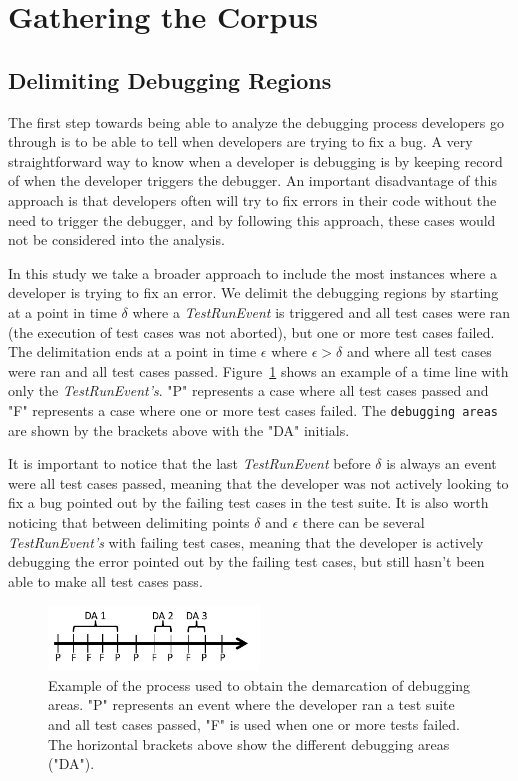 \documentclass[sigconf]{acmart}
\begin{document}
\section{Gathering the Corpus}
\subsection{Delimiting Debugging Regions}
The first step towards being able to analyze the debugging
process developers go through is to be able to tell when
developers are trying to fix a bug. A very straightforward 
way to know when a developer is debugging is by keeping
record of when the developer triggers the debugger. An important
disadvantage of this approach is that 
developers often will try to fix errors in their code without the
need to trigger the debugger, and by following this approach,
these cases would not
be considered into the analysis.

In this study we take a broader approach to include the most 
instances where a developer is trying to fix an error.
We delimit the debugging regions by starting at a point
in time $\delta$ where a \textit{TestRunEvent} is triggered and 
all test cases were ran (the execution of test cases
was not aborted), but one or more test cases failed.
The delimitation ends at a point in time $\epsilon $ where $ \epsilon > \delta$ 
and where all test cases were ran and all test cases passed.
Figure~\ref{demarcations} shows an example of a time line
with only the \textit{TestRunEvent's}. "P" represents a case
where all test cases passed and "F" represents a case where one
or more test cases failed. The \texttt{debugging areas} are shown by
the brackets above with the "DA" initials. 


It is important to notice that the last \textit{TestRunEvent} before $\delta$ 
is always an event were all test cases passed, meaning that the
developer was not actively looking to fix a bug pointed out by the
failing test cases in the test suite. It is also worth noticing
that between delimiting points $\delta$ and $\epsilon$ there can be 
several \textit{TestRunEvent's} with failing test cases, meaning
that the developer is actively debugging the error pointed out
by the failing test cases, but still hasn't been able to make
all test cases pass.

\begin{figure}[h]
\label{demarcations}
\caption{Example of the process used to obtain the demarcation of
debugging areas. "P" 
represents an event where the developer ran a test suite and all test cases
passed, "F" is used when one or more tests failed. The horizontal brackets
above show the different debugging areas ("DA").}
\centering
\includegraphics[width=0.5\textwidth]{images/demarcations.png}
\end{figure}
\end{document}
